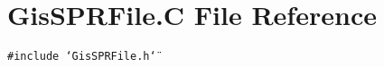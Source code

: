 \hypertarget{GisSPRFile_8C}{
\section{Gis\-SPRFile.C File Reference}
\label{GisSPRFile_8C}
}
{\tt \#include \char`\"{}Gis\-SPRFile.h\char`\"{}}\par
